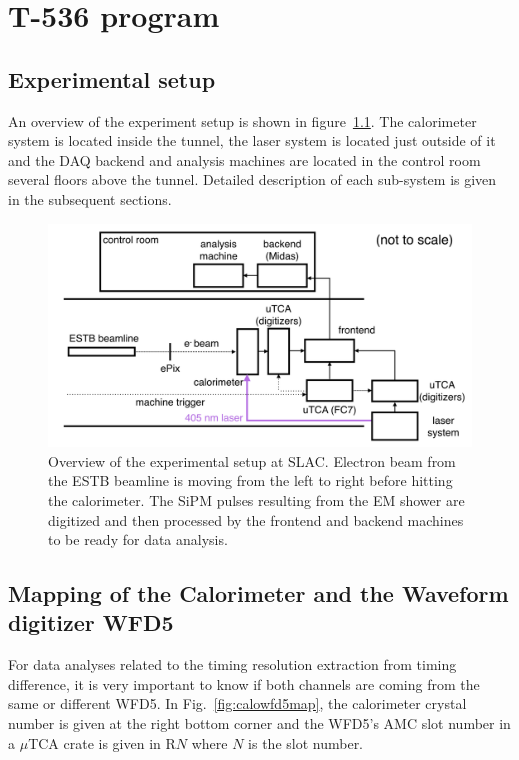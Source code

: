 \chapter{T-536 program}
\label{chap:program}

\section{Experimental setup}

An overview of the experiment setup is shown in figure~\ref{fig:overview}.
%
The calorimeter system is located inside the tunnel,
the laser system is located just outside of it and 
the DAQ backend and analysis machines are located in the control room
several floors above the tunnel.
%
Detailed description of each sub-system is given in the subsequent sections. 
%
\begin{figure}[htbp]
\centering
\includegraphics[width=.85\textwidth]{pics/SLACoverview}
\caption{Overview of the experimental setup at SLAC. 
Electron beam from the ESTB beamline is moving from
the left to right before hitting the calorimeter.
The SiPM pulses resulting from the EM shower are digitized and
then processed by the frontend and backend machines to be ready for data analysis.
}\label{fig:overview}
\end{figure}

\section{Mapping of the Calorimeter and the Waveform digitizer WFD5}

For data analyses related to the timing resolution extraction from timing difference, it is very important to know if both channels are coming from the same or different WFD5. In Fig.~\ref{fig:calowfd5map},
the calorimeter crystal number is given at the right bottom corner and the WFD5's AMC slot number in a $\mu$TCA crate is given in R$N$ where $N$ is the slot number.

